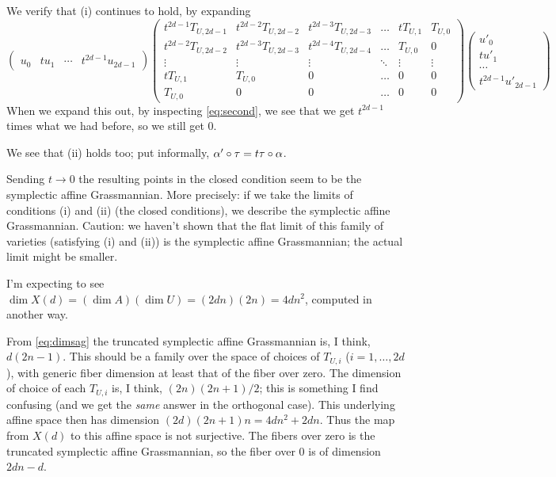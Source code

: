 {We verify that (i) continues to hold, by expanding 
$$
\begin{pmatrix}
  u_0 & t u_1 & \cdots & t^{2d-1} u_{2d-1} \end{pmatrix}
 \begin{pmatrix}
t^{2d-1} T_{U,2d-1} & t^{2d-2}T_{U,2d-2} &  t^{2d-3} T_{U,2d-3} &  \hdots & t T_{U,1} & T_{U,0} \\
t^{2d-2}  T_{U,2d-2} &  t^{2d-3}T_{U,2d-3} & t^{2d-4}T_{U,2d-4} &  \hdots & T_{U,0} & 0 \\
   \vdots  & \vdots  &   \vdots  & \ddots & \vdots & \vdots \\
  t T_{U,1} & T_{U,0} & 0 & \hdots & 0 & 0 \\
   T_{U,0} & 0 & 0 & \hdots & 0 & 0 
  \end{pmatrix}
\begin{pmatrix}
  u'_0 \\ t u'_1 \\ \cdots \\ t^{2d-1} u'_{2d-1} \end{pmatrix}
$$
When we expand this out, by inspecting \eqref{eq:second}, we see that we get $t^{2d-1}$
times what we had before, so we still get $0$.

We see that (ii) holds too; put informally,  $\alpha' \circ \tau = t \tau \circ \alpha$.

 Sending $t \rightarrow 0$ the
resulting points in the closed condition
seem to be the symplectic affine Grassmannian.
More precisely:  if we take the limits of conditions (i) and (ii) (the closed conditions),
we describe the symplectic affine Grassmannian.  Caution:  we haven't shown that the flat limit of this family of varieties (satisfying (i) and (ii)) is the symplectic affine Grassmannian; the actual limit might be smaller.

I'm expecting to see $\dim X(d) = (\dim A) (\dim U) = (2dn)(2n) = 4dn^2$, computed in another way.


From \eqref{eq:dimsag} the truncated symplectic affine Grassmannian
is, I think, $d(2n-1)$.  This should be a  family over the space
of choices of $T_{U,i}$ ($i=1, \dots, 2d$), with generic fiber dimension
at least that of the fiber over zero.
The dimension of choice of each $T_{U,i}$ is, I think, $(2n)(2n+1)/2$; this is something
I find confusing (and we get the {\em same} answer in the orthogonal case).
This underlying affine
space then  has dimension $(2d)(2n+1)n = 4dn^2+2dn$.  Thus the map from $X(d)$ to this affine space is not surjective.  The fibers over zero is 
 the truncated symplectic affine
 Grassmannian, so the fiber over $0$ is of dimension $2dn-d$.

}
